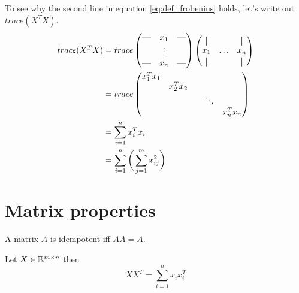 To see why the second line in equation \ref{eq:def_frobenius}
holds, let's write out $trace(X^TX)$.
\begin{equation}
\begin{split}
trace(X^TX) &= trace
\begin{pmatrix}
\horzbar & x_1 & \horzbar\\
 & \vdots & \\
\horzbar & x_n & \horzbar\\
\end{pmatrix}
\begin{pmatrix}
\vertbar & & \vertbar\\
 x_1 & \hdots & x_n \\
\vertbar & & \vertbar\\
\end{pmatrix}\\
&= trace
\begin{pmatrix}
x_1^Tx_1 & & &\\
& x_2^Tx_2 & &\\
& & & \ddots &\\
& & & & x_n^Tx_n\\
\end{pmatrix}\\
&= \sum_{i = 1}^{n} x_i^Tx_i\\
&= \sum_{i = 1}^{n} \bigg( \sum_{j=1}^{m} x_{ij}^2 \bigg)
\end{split}
\end{equation}

\section{Matrix properties}
\begin{defn}
A matrix $A$ is idempotent iff $AA = A$.
\end{defn}

\begin{prop}
Let $X \in \mathbb{R}^{m \times n}$ then
\begin{equation}
XX^T = \sum_{i=1}^{n}x_ix_i^T
\end{equation}
\end{prop}

